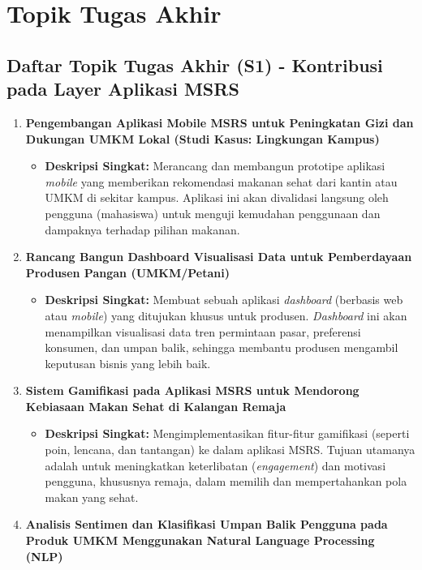 \documentclass[
  letterpaper,
  DIV=11,
  numbers=noendperiod]{scrreprt}
\providecommand{\tightlist}{%
  \setlength{\itemsep}{0pt}\setlength{\parskip}{0pt}}
\begin{document}

\chapter{Topik Tugas Akhir}\label{topik-tugas-akhir}

\section{\texorpdfstring{\textbf{Daftar Topik Tugas Akhir (S1) -
Kontribusi pada Layer Aplikasi
MSRS}}{Daftar Topik Tugas Akhir (S1) - Kontribusi pada Layer Aplikasi MSRS}}\label{daftar-topik-tugas-akhir-s1---kontribusi-pada-layer-aplikasi-msrs}

\begin{enumerate}
\def\labelenumi{\arabic{enumi}.}
\tightlist
\item
  \textbf{Pengembangan Aplikasi Mobile MSRS untuk Peningkatan Gizi dan
  Dukungan UMKM Lokal (Studi Kasus: Lingkungan Kampus)}

  \begin{itemize}
  \tightlist
  \item
    \textbf{Deskripsi Singkat:} Merancang dan membangun prototipe
    aplikasi \emph{mobile} yang memberikan rekomendasi makanan sehat
    dari kantin atau UMKM di sekitar kampus. Aplikasi ini akan
    divalidasi langsung oleh pengguna (mahasiswa) untuk menguji
    kemudahan penggunaan dan dampaknya terhadap pilihan makanan.
  \end{itemize}
\item
  \textbf{Rancang Bangun Dashboard Visualisasi Data untuk Pemberdayaan
  Produsen Pangan (UMKM/Petani)}

  \begin{itemize}
  \tightlist
  \item
    \textbf{Deskripsi Singkat:} Membuat sebuah aplikasi \emph{dashboard}
    (berbasis web atau \emph{mobile}) yang ditujukan khusus untuk
    produsen. \emph{Dashboard} ini akan menampilkan visualisasi data
    tren permintaan pasar, preferensi konsumen, dan umpan balik,
    sehingga membantu produsen mengambil keputusan bisnis yang lebih
    baik.
  \end{itemize}
\item
  \textbf{Sistem Gamifikasi pada Aplikasi MSRS untuk Mendorong Kebiasaan
  Makan Sehat di Kalangan Remaja}

  \begin{itemize}
  \tightlist
  \item
    \textbf{Deskripsi Singkat:} Mengimplementasikan fitur-fitur
    gamifikasi (seperti poin, lencana, dan tantangan) ke dalam aplikasi
    MSRS. Tujuan utamanya adalah untuk meningkatkan keterlibatan
    (\emph{engagement}) dan motivasi pengguna, khususnya remaja, dalam
    memilih dan mempertahankan pola makan yang sehat.
  \end{itemize}
\item
  \textbf{Analisis Sentimen dan Klasifikasi Umpan Balik Pengguna pada
  Produk UMKM Menggunakan Natural Language Processing (NLP)}


\end{enumerate}
\end{document}
